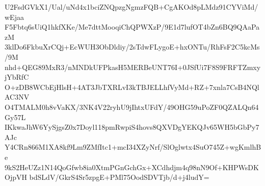 U2FsdGVkX1/Ual/uNd4x1bciZNQpzgNgmzFQB+CgAKOd8pLMdz91CYViMd/wEjaa
F5Fbtq6sUiQ1hkfXKe/Me7dttMooqiChQPWXzP/9E1d7lufOT4bZn6BQ9QAaPazM
3klDo6FkbuXrCQj+EcWUH3ObDldiy/2sTdwFLygoE+hxONTu/RhFsF2C5kcMs/9M
nhd+QEG89MxR3/nMNDkUFPkasH5MERBeUNT76I+0JSfUi7F8S9FRFTZmxyjYbRfC
O+zDB8WCbEjHlsH+4AT3JbTXRLvI3kTBJELLhfVyMd+RZ+7xnla7CsB4NQlAC3NV
O4TMALM0h8vVaKX/3NK4V22ryhU9jIhtxUFdY/49OHG59uPoZF0QZALQn64Gy57L
IKkwaJhW6YySjgsZ0x7Doyl118pmRwpiS4hovs8QXVDgYEKQJv65WH5bGbPy7AJc
Y4CRn866M1XA8kf9Lm9ZMfItc1+mcI34XZyNrf/SlOglwtx4SuO745Z+wgKmlhBe
9kS2HeUZz1N14QoGfwb8ia0XtmPGnGchGx+XCdhdjm4q98nN9Of+KHPWsDKOjpVH
bdSLdV/GkrS4Sr5zpgE+PMl75OodSDVTjb/d+j4ludY=
